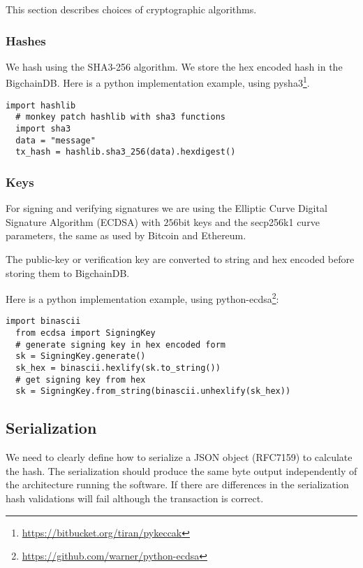 This section describes choices of cryptographic algorithms. 

\subsubsection{Hashes}

We hash using the SHA3-256 algorithm. We store the hex encoded hash in the BigchainDB. Here is a python implementation example, using pysha3\footnote{\url{https://bitbucket.org/tiran/pykeccak}}.

\begin{minipage}{\linewidth}
  \begin{lstlisting}[style=python]
  import hashlib 
  # monkey patch hashlib with sha3 functions 
  import sha3 
  data = "message" 
  tx_hash = hashlib.sha3_256(data).hexdigest()\end{lstlisting}
\end{minipage}

\subsubsection{Keys}
For signing and verifying signatures we are using the Elliptic Curve Digital Signature Algorithm (ECDSA) with $256$bit keys and the secp256k1 curve parameters, the same as used by Bitcoin and Ethereum.

The public-key or verification key are converted to string and hex encoded before storing them to BigchainDB.

\medskip
\noindent Here is a python implementation example, using \mbox{python-ecdsa}\footnote{\url{https://github.com/warner/python-ecdsa}}:

\begin{minipage}{\linewidth}
  \begin{lstlisting}[style=python]
  import binascii
  from ecdsa import SigningKey 
  # generate signing key in hex encoded form 
  sk = SigningKey.generate() 
  sk_hex = binascii.hexlify(sk.to_string()) 
  # get signing key from hex 
  sk = SigningKey.from_string(binascii.unhexlify(sk_hex))\end{lstlisting}
\end{minipage}


\subsection{Serialization}
We need to clearly define how to serialize a JSON object (RFC7159) to calculate the hash. 
The serialization should produce the same byte output independently of the architecture running the software.
If there are differences in the serialization hash validations will fail although the transaction is correct.

